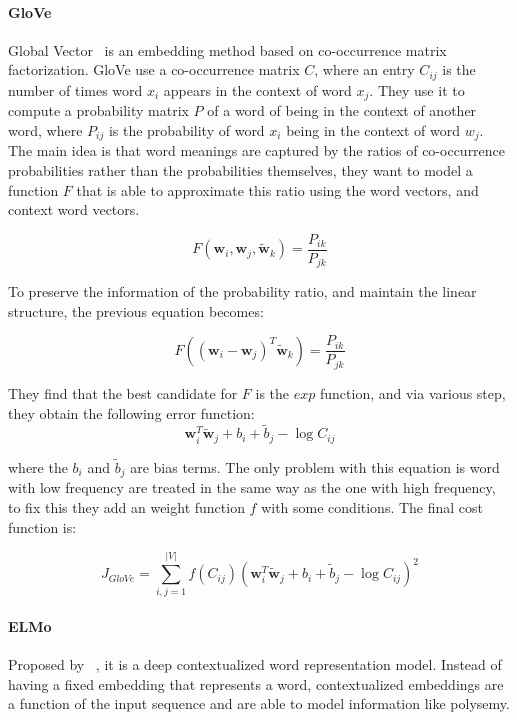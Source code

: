 \paragraph{GloVe} 
Global Vector~\citep{pennington2014glove} is an embedding method based on co-occurrence matrix factorization. GloVe use a co-occurrence matrix $C$, where an entry $C_{ij}$ is the number of times word $x_i$ appears in the context of word $x_j$. They use it to compute a probability matrix $P$ of a word of being in the context of another word, where $P_{ij}$ is the probability of word $x_i$ being in the context of word $w_j$. The main idea is that word meanings are captured by the ratios of co-occurrence probabilities rather than the probabilities themselves, they want to model a function $F$ that is able to approximate this ratio using the word vectors, and context word vectors.

\begin{equation}
F\left(\mathbf{w}_{i}, \mathbf{w}_{j}, \tilde{\mathbf{w}}_{k}\right)=\frac{P_{i k}}{P_{j k}}
\end{equation}

To preserve the information of the probability ratio, and maintain the linear structure, the previous equation becomes: 

\begin{equation}
F\left(\left(\mathbf{w}_{i}-\mathbf{w}_{j}\right)^{T} \tilde{\mathbf{w}}_{k}\right)=\frac{P_{i k}}{P_{j k}}
\end{equation}

They find that the best candidate for $F$ is the $exp$ function, and via various step, they obtain the following error function:
\begin{equation}
    \mathbf{w}_{i}^{T} \tilde{\mathbf{w}}_{j}+b_{i}+\tilde{b}_{j}-\log C_{i j}
\end{equation}

where the $b_i$ and $\tilde{b}_j$ are bias terms. The only problem with this equation is word with low frequency are treated in the same way as the one with high frequency, to fix this they add an weight function $f$ with some conditions. The final cost function is:

\begin{equation}
J_{GloVe} = \sum_{i, j=1}^{|V|} f\left(C_{i j}\right)\left(\mathbf{w}_{i}^{T} \tilde{\mathbf{w}}_{j}+b_{i}+\tilde{b}_{j}-\log C_{i j}\right)^{2}
\end{equation}

\paragraph{ELMo} Proposed by ~\cite{peters2018elmo}, it is a deep contextualized word representation model. Instead of having a fixed embedding that represents a word, contextualized embeddings are a function of the input sequence and are able to model information like polysemy.

